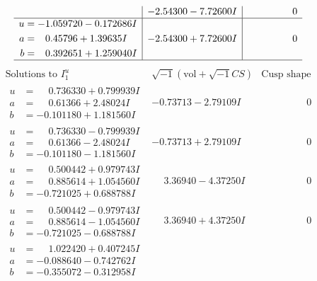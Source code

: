 \documentclass[1p]{elsarticle_modified}
\theoremstyle{definition}
\newcommand{\I}{\sqrt{-1}}
\begin{document}
$$\begin{array}{c|c|c}
 & -2.54300 - 7.72600 I & \phantom{-0.000000 } 0 \\ \hline\begin{aligned}
u &= -1.059720 - 0.172686 I \\
a &= \phantom{-}0.45796 + 1.39635 I \\
b &= \phantom{-}0.392651 + 1.259040 I\end{aligned}
 & -2.54300 + 7.72600 I & \phantom{-0.000000 } 0\\
 \hline 
 \end{array}$$\newpage$$\begin{array}{c|c|c}  
\text{Solutions to }I^u_{1}& \I (\text{vol} + \sqrt{-1}CS) & \text{Cusp shape}\\
 \hline 
\begin{aligned}
u &= \phantom{-}0.736330 + 0.799939 I \\
a &= \phantom{-}0.61366 + 2.48024 I \\
b &= -0.101180 + 1.181560 I\end{aligned}
 & -0.73713 - 2.79109 I & \phantom{-0.000000 } 0 \\ \hline\begin{aligned}
u &= \phantom{-}0.736330 - 0.799939 I \\
a &= \phantom{-}0.61366 - 2.48024 I \\
b &= -0.101180 - 1.181560 I\end{aligned}
 & -0.73713 + 2.79109 I & \phantom{-0.000000 } 0 \\ \hline\begin{aligned}
u &= \phantom{-}0.500442 + 0.979743 I \\
a &= \phantom{-}0.885614 + 1.054560 I \\
b &= -0.721025 + 0.688788 I\end{aligned}
 & \phantom{-}3.36940 - 4.37250 I & \phantom{-0.000000 } 0 \\ \hline\begin{aligned}
u &= \phantom{-}0.500442 - 0.979743 I \\
a &= \phantom{-}0.885614 - 1.054560 I \\
b &= -0.721025 - 0.688788 I\end{aligned}
 & \phantom{-}3.36940 + 4.37250 I & \phantom{-0.000000 } 0 \\ \hline\begin{aligned}
u &= \phantom{-}1.022420 + 0.407245 I \\
a &= -0.088640 - 0.742762 I \\
b &= -0.355072 - 0.312958 I\end{aligned}

\end{array}$$
\end{document}
